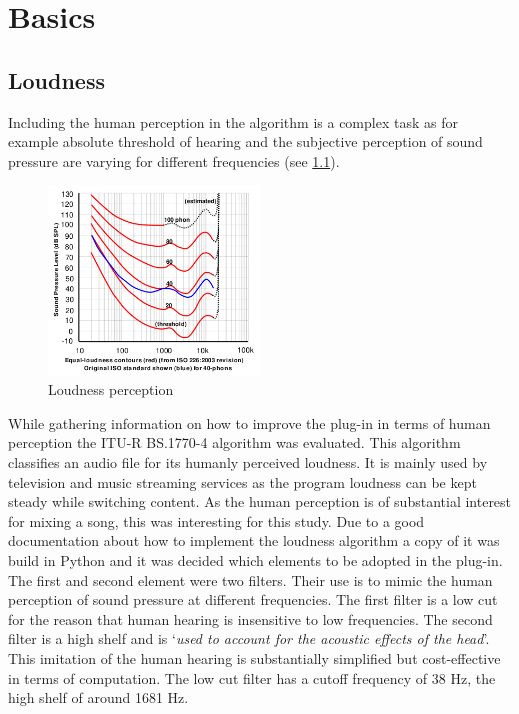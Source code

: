 \chapter{Basics}
\label{chapter:basics}

\section{Loudness}

Including the human perception in the algorithm is a complex task as for example absolute threshold of hearing and the subjective perception of sound pressure are varying for different frequencies (see \ref{LDNSGraph}).\\

\begin{figure}[H]
\includegraphics[width=0.5\textwidth]{images/loudnessGraph}
	\centering
	\caption{Loudness perception\cite{wikiLoud}}
	\label{LDNSGraph}
\end{figure}

While gathering information on how to improve the plug-in in terms of human perception the ITU-R BS.1770-4\cite{ITUalgo} algorithm was evaluated. This algorithm classifies an audio file for its humanly perceived loudness. It is mainly used by television and music streaming services as the program loudness can be kept steady while switching content. As the human perception is of substantial interest for mixing a song, this was interesting for this study. Due to a good documentation about how to implement the loudness algorithm a copy of it was build in Python and it was decided which elements to be adopted in the plug-in. The first and second element were two filters. Their use is to mimic the human perception of sound pressure at different frequencies. The first filter is a low cut for the reason that human hearing is insensitive to low frequencies. The second filter is a high shelf and is ‘\textit{used to account for the acoustic effects of the head}’\cite{ITUalgo}. This imitation of the human hearing is substantially simplified but cost-effective in terms of computation. The low cut filter has a cutoff frequency of 38 Hz, the high shelf of around 1681 Hz.\\

